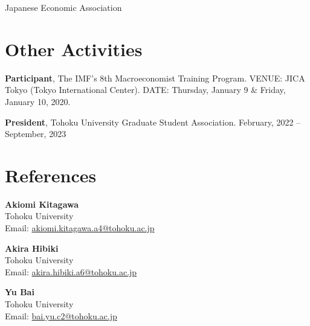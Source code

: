 \documentclass[12pt]{article}
\begin{document}
Japanese Economic Association

\section{Other Activities}

\textbf{Participant}, The IMF's 8th Macroeconomist Training Program. VENUE: JICA Tokyo (Tokyo International Center). DATE: Thursday, January 9 & Friday, January 10, 2020.

\textbf{President}, Tohoku University Graduate Student Association. February, 2022 -- September, 2023

\section{\sc References}

	{\bf Akiomi Kitagawa}\\ 
	Tohoku University \\
	Email: \href{mailto:akiomi.kitagawa.a4@tohoku.ac.jp}{akiomi.kitagawa.a4@tohoku.ac.jp}

	\vspace{0.5em}

	{\bf Akira Hibiki} \\
	Tohoku University\\
	Email: \href{mailto:akira.hibiki.a6@tohoku.ac.jp}{akira.hibiki.a6@tohoku.ac.jp}

	\vspace{0.5em}

	{\bf Yu Bai} \\ 
	Tohoku University\\
	Email: \href{mailto:bai.yu.c2tohoku.ac.jp}{bai.yu.c2@tohoku.ac.jp}
\end{document}
